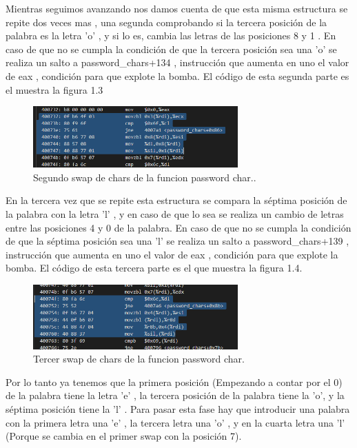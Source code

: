 	Mientras seguimos avanzando nos damos cuenta de que esta misma estructura se repite dos veces mas , una segunda comprobando si la tercera posición de la palabra es la letra 'o' , y si lo es, cambia las letras de las posiciones 8 y 1 .
	En caso de que no se cumpla la condición de que la tercera posición sea una 'o' se realiza un salto a password\_chars+134 , 
	instrucción que aumenta en uno el valor de eax , condición para que explote la bomba.
	El código de esta segunda parte es el muestra la figura 1.3
	
	\begin{figure}[htb]
		\centering
		\includegraphics[width=0.7\textwidth]{./imagenes/5}
		\caption{Segundo swap de chars de la funcion password char..} \label{fig:1}
	\end{figure}
	
	En la tercera vez que se repite esta estructura se compara la séptima posición de la palabra con la letra 'l' , y en caso de que lo sea se realiza un 
	cambio de letras entre las posiciones 4 y 0 de la palabra.
	En caso de que no se cumpla la condición de que la séptima posición sea una 'l' se realiza un salto a password\_chars+139 , 
	instrucción que aumenta en uno el valor de eax , condición para que explote la bomba.
	El código de esta tercera parte es el que muestra la figura 1.4. \\
	
	\begin{figure}[htb]
		\centering
		\includegraphics[width=0.7\textwidth]{./imagenes/6}
		\caption{Tercer swap de chars de la funcion password char.} \label{fig:1}
	\end{figure}	 
	
	Por lo tanto ya tenemos que la primera posición (Empezando a contar por el 0) de la palabra tiene la letra 'e' , la tercera posición de la palabra tiene la 'o',	y la séptima posición tiene la 'l' . Para pasar esta fase hay que introducir una palabra con la primera letra una 'e' , la tercera letra una 'o' , y en la cuarta letra una 'l' (Porque se cambia en el primer swap con la posición 7). \\
	
